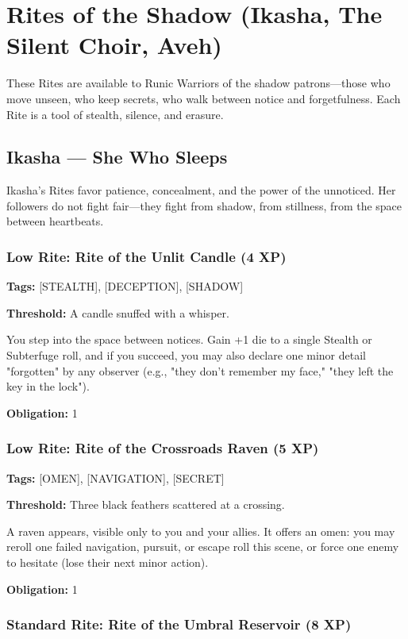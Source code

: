 \section{Rites of the Shadow (Ikasha, The Silent Choir, Aveh)}

These Rites are available to Runic Warriors of the shadow patrons—those who move unseen, who keep secrets, who walk between notice and forgetfulness. Each Rite is a tool of stealth, silence, and erasure.

\subsection{Ikasha — She Who Sleeps}

Ikasha's Rites favor patience, concealment, and the power of the unnoticed. Her followers do not fight fair—they fight from shadow, from stillness, from the space between heartbeats.

\subsubsection{Low Rite: Rite of the Unlit Candle (4 XP)}

\textbf{Tags:} [STEALTH], [DECEPTION], [SHADOW]

\textbf{Threshold:} A candle snuffed with a whisper.

You step into the space between notices. Gain +1 die to a single Stealth or Subterfuge roll, and if you succeed, you may also declare one minor detail "forgotten" by any observer (e.g., "they don't remember my face," "they left the key in the lock").

\textbf{Obligation:} 1

\subsubsection{Low Rite: Rite of the Crossroads Raven (5 XP)}

\textbf{Tags:} [OMEN], [NAVIGATION], [SECRET]

\textbf{Threshold:} Three black feathers scattered at a crossing.

A raven appears, visible only to you and your allies. It offers an omen: you may reroll one failed navigation, pursuit, or escape roll this scene, or force one enemy to hesitate (lose their next minor action).

\textbf{Obligation:} 1

\subsubsection{Standard Rite: Rite of the Umbral Reservoir (8 XP)}

